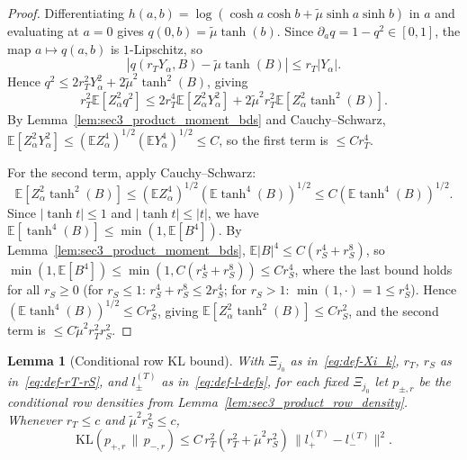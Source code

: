 \documentclass[10pt]{article}
\newtheorem{lemma}{Lemma}
\newcommand{\Ebb}{\mathbb E}
\newcommand{\KL}{\mathrm{KL}}
\newcommand{\trg}{T}
\begin{document}
\begin{proof}
Differentiating $h(a,b)=\log(\cosh a\cosh b+\tilde\mu\sinh a\sinh b)$ in $a$
and evaluating at $a=0$ gives $q(0,b)=\tilde\mu\tanh(b)$.
Since $\partial_a q=1-q^2\in[0,1]$, the map $a\mapsto q(a,b)$ is $1$-Lipschitz, so
\[
    |q(r_T Y_\alpha,B)-\tilde\mu\tanh(B)|\le r_T|Y_\alpha|.
\]
Hence $q^2\le 2r_T^2 Y_\alpha^2+2\tilde\mu^2\tanh^2(B)$, giving
\[
    r_T^2\Ebb[Z_\alpha^2 q^2]
    \le 2r_T^4\Ebb[Z_\alpha^2 Y_\alpha^2]
       +2\tilde\mu^2 r_T^2\Ebb[Z_\alpha^2\tanh^2(B)].
\]
By Lemma~\ref{lem:sec3_product_moment_bds} and Cauchy--Schwarz,
$\Ebb[Z_\alpha^2 Y_\alpha^2]\le(\Ebb Z_\alpha^4)^{1/2}(\Ebb Y_\alpha^4)^{1/2}\le C$,
so the first term is $\le Cr_T^4$.

For the second term, apply Cauchy--Schwarz:
$$\Ebb[Z_\alpha^2\tanh^2(B)]\le(\Ebb Z_\alpha^4)^{1/2}(\Ebb\tanh^4(B))^{1/2}\le C(\Ebb\tanh^4(B))^{1/2}.$$
Since $|\tanh t|\le1$ and $|\tanh t|\le|t|$, we have $\Ebb[\tanh^4(B)]\le\min(1,\Ebb[B^4])$.
By Lemma~\ref{lem:sec3_product_moment_bds}, $\Ebb|B|^4\le C(r_S^4+r_S^8)$, so
$\min(1,\Ebb[B^4])\le\min(1,C(r_S^4+r_S^8))\le Cr_S^4$,
where the last bound holds for all $r_S\ge0$
(for $r_S\le1$: $r_S^4+r_S^8\le2r_S^4$; for $r_S>1$: $\min(1,\cdot)=1\le r_S^4$).
Hence $(\Ebb\tanh^4(B))^{1/2}\le Cr_S^2$, giving $\Ebb[Z_\alpha^2\tanh^2(B)]\le Cr_S^2$,
and the second term is $\le C\tilde\mu^2 r_T^2 r_S^2$.
\end{proof}

\begin{lemma}[Conditional row KL bound]
\label{lem:sec3_product_row_kl}
With $\Xi_{j_0}$ as in~\eqref{eq:def-Xi_k}, $r_T$, $r_S$ as in~\eqref{eq:def-rT-rS}, and $l^{(\trg)}_\pm$ as in~\eqref{eq:def-l-defs},
for each fixed $\Xi_{j_0}$ let $p_{\pm,r}$ be the conditional row densities from
Lemma~\ref{lem:sec3_product_row_density}.  Whenever $r_T\le c$ and
$\tilde\mu^2 r_S^2\le c$,
\begin{equation}
\label{eq:sec3_product_row_kl}
    \KL(p_{+,r}\,\|\,p_{-,r})
    \le
    C\,r_T^2(r_T^2+\tilde\mu^2 r_S^2)\,\|l^{(\trg)}_+-l^{(\trg)}_-\|^2.
\end{equation}
\end{lemma}
\end{document}
